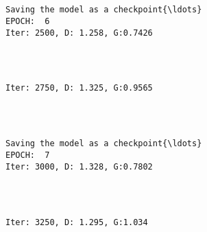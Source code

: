\documentclass[11pt]{article}
\begin{document}
    \begin{center}
    \end{center}
    { \hspace*{\fill} \\}
    
    \begin{Verbatim}[commandchars=\\\{\}]

Saving the model as a checkpoint{\ldots}
EPOCH:  6
Iter: 2500, D: 1.258, G:0.7426
    \end{Verbatim}

    \begin{center}
    \end{center}
    { \hspace*{\fill} \\}
    
    \begin{Verbatim}[commandchars=\\\{\}]

Iter: 2750, D: 1.325, G:0.9565
    \end{Verbatim}

    \begin{center}
    \end{center}
    { \hspace*{\fill} \\}
    
    \begin{Verbatim}[commandchars=\\\{\}]

Saving the model as a checkpoint{\ldots}
EPOCH:  7
Iter: 3000, D: 1.328, G:0.7802
    \end{Verbatim}

    \begin{center}
    \end{center}
    { \hspace*{\fill} \\}
    
    \begin{Verbatim}[commandchars=\\\{\}]

Iter: 3250, D: 1.295, G:1.034
    \end{Verbatim}
\end{document}
